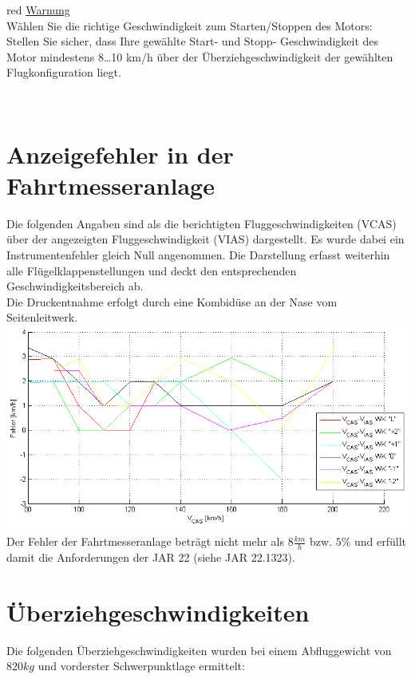 \begin{color}{red}
\large{\underline{Warnung}}\\
Wählen Sie die richtige Geschwindigkeit zum Starten/Stoppen des Motors: \\
Stellen Sie sicher, dass Ihre gewählte Start- und Stopp- Geschwindigkeit des Motor mindestens 8…10 km/h über der Überziehgeschwindigkeit der gewählten Flugkonfiguration liegt.
\end{color}\\
\newpage
\section{Anzeigefehler in der Fahrtmesseranlage}
Die folgenden Angaben sind als die berichtigten Fluggeschwindigkeiten (VCAS) über der angezeigten Fluggeschwindigkeit (VIAS) dargestellt. Es wurde dabei ein Instrumentenfehler gleich Null angenommen. Die Darstellung erfasst weiterhin alle Flügelklappenstellungen und deckt den entsprechenden Geschwindigkeitsbereich ab.\\
\newline
Die Druckentnahme erfolgt durch eine Kombidüse an der Nase vom Seitenleitwerk.\\
\newline
\includegraphics[width=.9\textwidth]{fahrtmesserkalibrierung.png}
\newline
Der Fehler der Fahrtmesseranlage beträgt nicht mehr als $8 \frac{km}{h}$ bzw. $5\%$ und erfüllt damit die Anforderungen der JAR 22 (siehe JAR 22.1323).

\section{Überziehgeschwindigkeiten}

Die folgenden Überziehgeschwindigkeiten wurden bei einem Abfluggewicht von $820kg$ und vorderster Schwerpunktlage ermittelt:

